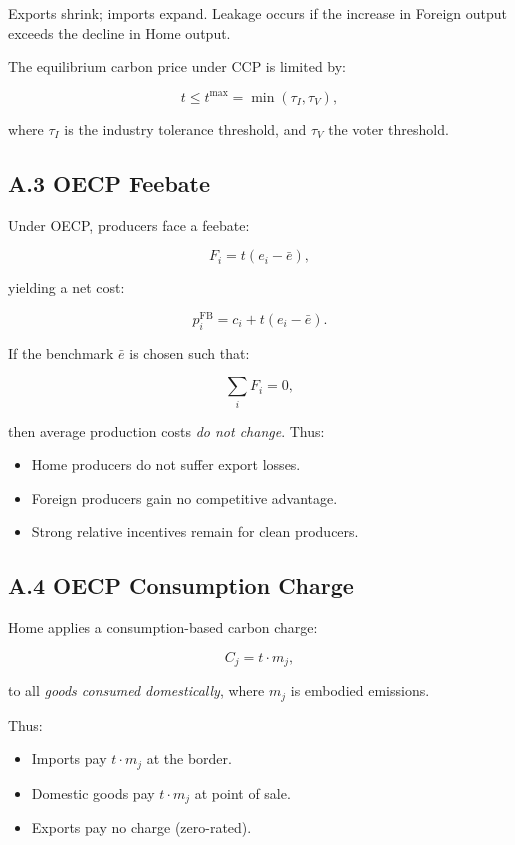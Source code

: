 \documentclass[12pt]{article}
\begin{document}
Exports shrink; imports expand.  
Leakage occurs if the increase in Foreign output exceeds the decline in Home output.

The equilibrium carbon price under CCP is limited by:

\[
t \le t^{\max} = \min(\tau_I, \tau_V),
\]

where $\tau_I$ is the industry tolerance threshold, and $\tau_V$ the voter threshold.

\subsection{A.3 OECP Feebate}

Under OECP, producers face a feebate:

\[
F_i = t (e_i - \bar e),
\]

yielding a net cost:

\[
p_i^{\text{FB}} = c_i + t(e_i - \bar e).
\]

If the benchmark $\bar e$ is chosen such that:

\[
\sum_i F_i = 0,
\]

then average production costs \emph{do not change}.  
Thus:

\begin{itemize}
    \item Home producers do not suffer export losses.
    \item Foreign producers gain no competitive advantage.
    \item Strong relative incentives remain for clean producers.
\end{itemize}

\subsection{A.4 OECP Consumption Charge}

Home applies a consumption-based carbon charge:

\[
C_j = t \cdot m_j,
\]

to all \emph{goods consumed domestically}, where $m_j$ is embodied emissions.

Thus:

\begin{itemize}
    \item Imports pay $t \cdot m_j$ at the border.
    \item Domestic goods pay $t \cdot m_j$ at point of sale.
    \item Exports pay no charge (zero-rated).
\end{itemize}
\end{document}
